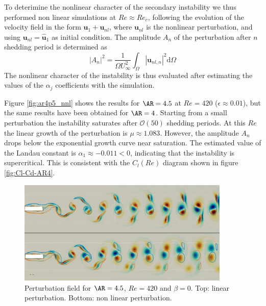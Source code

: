 To deterimine the nonlinear character of the secondary instability we thus performed non linear simulations at $Re \approx Re_c$, following the evolution of the velocity field in the form $\bm{u}_1 + \bm{u}_{nl}$, where $\bm{u}_{nl}$ is the nonlinear perturbation, and using $\bm{u}_{nl} = \hat{\bm{u}}_1$ as initial condition. The amplitude $A_n$ of the perturbation after $n$ shedding period is determined as
%
\begin{equation}
  |A_n|^2 = \frac{1}{\Omega U_\infty^2} \int_{\Omega} | \bm{u}_{nl,n} |^2 \text{d} \Omega
\end{equation}
%
The nonlinear character of the instability is thus evaluated after estimating the values of the $\alpha_j$ coefficients with the simulation.

Figure \ref{fig:ar4p5_nnl} shows the results for $\AR=4.5$ at $Re=420$ ($\epsilon \approx 0.01$), but the same results have been obtained for $\AR=4$. Starting from a small perturbation the instability saturates after $\mathcal{O}(50)$ shedding periods. At this $Re$ the linear growth of the perturbation is $\mu \approx 1.083$. However, the amplitude $A_n$ drops below the exponential growth curve near saturation. The estimated value of the Landau constant is $\alpha_1 \approx - 0.011 <0$, indicating that the instability is supercritical. This is consistent with the $C_l(Re)$ diagram shown in figure \ref{fig:Cl-Cd-AR4}.

\begin{figure}
  \centering
  \includegraphics[width=0.9\textwidth]{./fig/AR4p5/nl_Re420.png}
  \caption{Perturbation field for $\AR=4.5$, $Re=420$ and $\beta=0$. Top: linear perturbation. Bottom: non linear perturbation.}
  \label{fig:pert-nl}
\end{figure}

